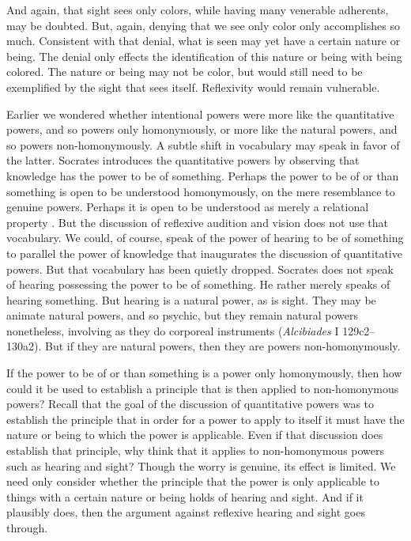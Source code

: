 And again, that sight sees only colors, while having many venerable adherents, may be doubted. But, again, denying that we see only color only accomplishes so much. Consistent with that denial, what is seen may yet have a certain nature or being. The denial only effects the identification of this nature or being with being colored. The nature or being may not be color, but would still need to be exemplified by the sight that sees itself. Reflexivity would remain vulnerable.

Earlier we wondered whether intentional powers were more like the quantitative powers, and so powers only homonymously, or more like the natural powers, and so powers non-homonymously. A subtle shift in vocabulary may speak in favor of the latter. Socrates introduces the quantitative powers by observing that knowledge has the power to be of something. Perhaps the power to be of or than something is open to be understood homonymously, on the mere resemblance to genuine powers. Perhaps it is open to be understood as merely a relational property \citep[24 n74]{Moore:2019aa}. But the discussion of reflexive audition and vision does not use that vocabulary. We could, of course, speak of the power of hearing to be of something to parallel the power of knowledge that inaugurates the discussion of quantitative powers. But that vocabulary has been quietly dropped. Socrates does not speak of hearing possessing the power to be of something. He rather merely speaks of hearing something. But hearing is a natural power, as is sight. They may be animate natural powers, and so psychic, but they remain natural powers nonetheless, involving as they do corporeal instruments (\emph{Alcibiades} I 129c2–130a2). But if they are natural powers, then they are powers non-homonymously.

If the power to be of or than something is a power only homonymously, then how could it be used to establish a principle that is then applied to non-homonymous powers? Recall that the goal of the discussion of quantitative powers was to establish the principle that in order for a power to apply to itself it must have the nature or being to which the power is applicable. Even if that discussion does establish that principle, why think that it applies to non-homonymous powers such as hearing and sight? Though the worry is genuine, its effect is limited. We need only consider whether the principle that the power is only applicable to things with a certain nature or being holds of hearing and sight. And if it plausibly does, then the argument against reflexive hearing and sight goes through.

